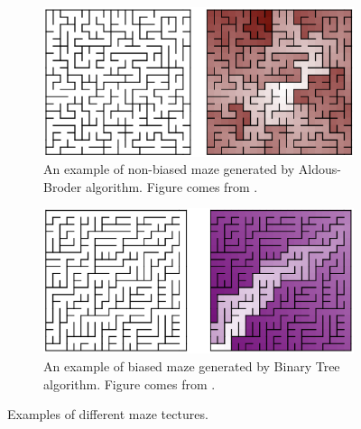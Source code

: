 \begin{figure}[!h]
    \centering
    \begin{subfigure}{.7\textwidth}
    \centering
    \includegraphics[width=.7\linewidth]{adlousbias}
    \caption{An example of non-biased maze generated by Aldous-Broder algorithm. Figure comes from \cite{JaBuck}.}
    \label{fig:sub1}
    \end{subfigure}%

    \begin{subfigure}{.7\textwidth}
    \centering
    \includegraphics[width=.7\linewidth]{binarybias}
    \caption{An example of biased maze generated by Binary Tree algorithm. Figure comes from \cite{JaBuck}.}
    \label{fig:sub2}
    \end{subfigure}
    \caption{Examples of different maze tectures.}
    \label{fig:test}
    \end{figure}


